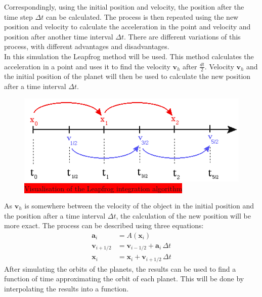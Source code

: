 \documentclass[reprint,english,notitlepage]{revtex4-2}
\begin{document}
Correspondingly, using the initial position and velocity, the position after the time step $\Delta t$ can be calculated.
The process is then repeated using the new position and velocity to calculate the acceleration in the point and velocity and position after another time interval $\Delta t$.
There are different variations of this process, with different advantages and disadvantages.\\
In this simulation the Leapfrog method will be used.
This method calculates the acceleration in a point and uses it to find the velocity $\textbf{v}_h$ after $ \frac{dt}{2}$.
Velocity $\textbf{v}_h$ and the initial position of the planet will then be used to calculate the new position after a time interval $\Delta t$.\newline
\begin{figure}[h]
	\centering
	\includegraphics[scale=0.4]{Figures/leapfrog1}
	\caption{\colorbox{red}{Visualisation of the Leapfrog integration algorithm}}\label{fig:Leapfrog_vis}
\end{figure}\newline
As $\textbf{v}_h$ is somewhere between the velocity of the object in the initial position and the position after a time interval $\Delta t$, the calculation of the new position will be more exact.
The process can be described using three equations:
\begin{align*}
    \textbf{a}_i &= A(\textbf{x}_i)\\
	\textbf{v}_{i+1/2} &= \textbf{v}_{i-1/2} + \textbf{a}_i\,\Delta t\\
	\textbf{x}_{i} &= \textbf{x}_i + \textbf{v}_{i+1/2}\,\Delta t
\end{align*}
After simulating the orbits of the planets, the results can be used to find a function of time approximating the orbit of each planet.
This will be done by interpolating the results into a function.\newline \newline
\end{document}
